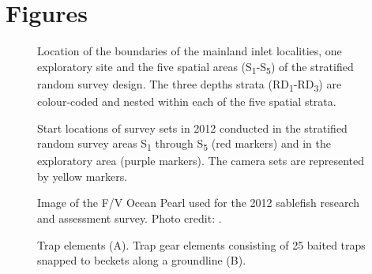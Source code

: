 \documentclass[12pt]{article}\usepackage[]{graphicx}\usepackage[]{color}
\begin{document}
\hypertarget{figures}{%
\section{Figures}\label{figures}}


\begin{figure}[htb]

{\centering {} 

}

\caption{Location of the boundaries of the mainland inlet localities, one exploratory site and the five spatial areas (S\textsubscript{1}-S\textsubscript{5}) of the stratified random survey design. The three depths strata (RD\textsubscript{1}-RD\textsubscript{3}) are colour-coded and nested within each of the five spatial strata.}\label{fig:figure1}
\end{figure}
\clearpage


\begin{figure}[htb]

{\centering {} 

}

\caption{Start locations of survey sets in 2012 conducted in the stratified random survey areas S\textsubscript{1} through S\textsubscript{5} (red markers) and in the exploratory area (purple markers). The camera sets are represented by yellow markers.}\label{fig:figure2}
\end{figure}
\clearpage


\begin{figure}[htb]

{\centering {} 

}

\caption{Image of the F/V Ocean Pearl used for the 2012 sablefish research and assessment survey. Photo credit: .}\label{fig:figure3}
\end{figure}
\clearpage


\begin{figure}[htb]

{\centering {} 

}

\caption{Trap elements (A). Trap gear elements consisting of 25 baited traps snapped to beckets along a groundline (B).}\label{fig:figure4}
\end{figure}
\clearpage
\end{document}
